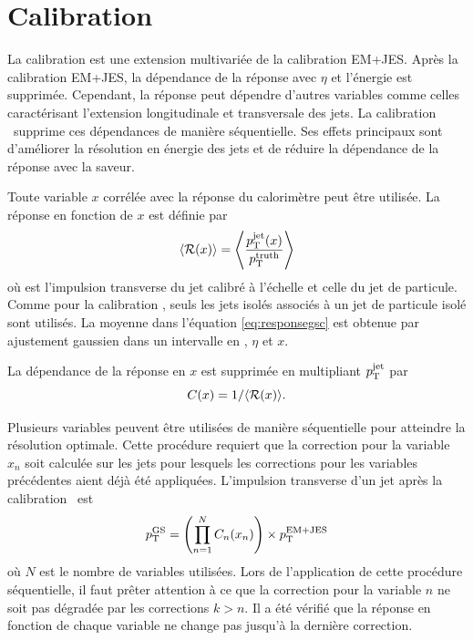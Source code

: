 \section{Calibration \GS}
\label{sec:GS}

La calibration \GS{} est une extension multivariée de la calibration EM+JES. Après la calibration EM+JES, la dépendance de la réponse avec $\eta$ et l'\'energie est supprimée. Cependant, la réponse peut dépendre d'autres variables comme celles caractérisant l'extension longitudinale et transversale des jets. La calibration \GS~supprime ces dépendances de manière séquentielle. Ses effets principaux sont d'am\'eliorer la résolution en énergie des jets et de réduire la dépendance de la réponse avec la saveur. 

Toute variable $x$ corr\'el\'ee avec la r\'eponse du calorim\`etre peut \^etre utilis\'ee. La r\'eponse en fonction de $x$ est d\'efinie par
\begin{equation} 
\label{eq:responsegsc}
                \langle \mathcal{R}(x)  \rangle  =  \left<\frac{p_{\mathrm{T}}^\mathrm{jet}(x)}{p_{\mathrm{T}}^\mathrm{truth}}\right>
\end{equation}
o\`u \ptjet{} est l'impulsion transverse du jet calibr\'e \`a l'\'echelle \EMJES{} et \pttrue{} celle du jet de particule. Comme pour la calibration \EMJES{}, seuls les jets isol\'es associ\'es \`a un jet de particule isol\'e sont utilis\'es. La moyenne dans l'\'equation \ref{eq:responsegsc} est obtenue par ajustement gaussien dans un intervalle en  \pttrue, $\eta$ et $x$.

La d\'ependance de la r\'eponse en $x$ est supprim\'ee en multipliant $p_{\mathrm{T}}^\mathrm{jet}$ par
\begin{equation}
\label{eq:gsc}
                C(x) = 1/ \langle \mathcal{R}(x) \rangle.
\end{equation}
 
Plusieurs variables peuvent \^etre utilis\'ees de mani\`ere s\'equentielle pour atteindre la r\'esolution optimale. Cette proc\'edure requiert que la correction pour la variable $x_{n}$ soit calcul\'ee sur les jets pour lesquels les corrections pour les variables pr\'ec\'edentes aient d\'ej\`a \'et\'e appliqu\'ees. L'impulsion transverse d'un jet après la calibration \GS~est
\begin{equation}
\label{eq:ptGSaftercalib}
p_{\mathrm{T}}^{\rm GS}=\left(\prod\limits_{n=1}^{N}C_n(x_n)\right)\times p_{\mathrm{T}}^{\rm EM+JES}
\end{equation}
où $N$ est le nombre de variables utilisées. Lors de l'application de cette procédure séquentielle, il faut prêter attention à ce que la correction pour la variable $n$ ne soit pas dégradée par les corrections $k>n$. Il a \'et\'e v\'erifi\'e que la r\'eponse en fonction de chaque variable ne change pas jusqu'\`a la derni\`ere correction. 

